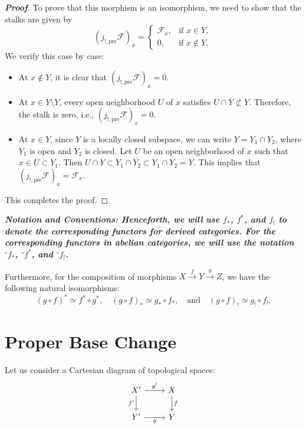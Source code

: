 \begin{proof}[\textbf{Proof}]
To prove that this morphism is an isomorphism, we need to show that the stalks are given by
\begin{equation*}
    (j_{!,\text{pre}}\mathcal{F})_x = 
    \begin{cases} 
        \mathcal{F}_x, & \text{if } x \in Y, \\
        0, & \text{if } x \notin Y. 
    \end{cases}
\end{equation*}
We verify this case by case:
\begin{itemize}
    \item At $x \notin \overline{Y}$, it is clear that $(j_{!,\text{pre}}\mathcal{F})_x = 0$.
    \item At $x \in \overline{Y} \setminus Y$, every open neighborhood $U$ of $x$ satisfies $U \cap \overline{Y} \not\subset Y$. Therefore, the stalk is zero, i.e., $(j_{!,\text{pre}}\mathcal{F})_x = 0$.
    \item At $x \in Y$, since $Y$ is a locally closed subspace, we can write $Y = Y_1 \cap Y_2$, where $Y_1$ is open and $Y_2$ is closed. Let $U$ be an open neighborhood of $x$ such that $x \in U \subset Y_1$. Then $U \cap \overline{Y} \subset Y_1 \cap \overline{Y_2} \subset Y_1 \cap Y_2 = Y$. This implies that $(j_{!,\text{pre}}\mathcal{F})_x = \mathcal{F}_x$.
\end{itemize}
This completes the proof.
\end{proof}

\textit{\textbf{Notation and Conventions:
Henceforth, we will use $f_*$, $f^*$, and $f_!$ to denote the corresponding functors for derived categories. 
For the corresponding functors in abelian categories, we will use the notation $^\circ f_*$, $^\circ f^*$, and $^\circ f_!$.
}}

Furthermore, for the composition of morphisms $X \xrightarrow{f} Y \xrightarrow{g} Z$, we have the following natural isomorphisms:
\begin{equation*}
    (g \circ f)^* \simeq f^* \circ g^*, \quad (g \circ f)_* \simeq g_* \circ f_*, \quad \text{and} \quad (g \circ f)_! \simeq g_! \circ f_!.
\end{equation*}

\section{Proper Base Change}

Let us consider a Cartesian diagram of topological spaces:
\begin{equation*}
\begin{tikzcd}
    X' \arrow[r, "g'"] \arrow[d, "f'"'] & X \arrow[d, "f"] \\
    Y' \arrow[r, "g"'] & Y
\end{tikzcd}
\end{equation*}

